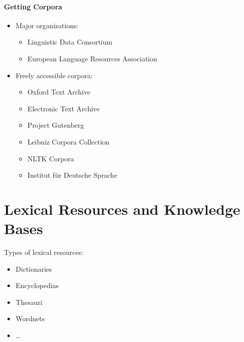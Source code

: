 			\paragraph{Getting Corpora} %
				\begin{itemize}
					\item Major organizations:
						\begin{itemize}
							\item Linguistic Data Consortium
							\item European Language Resources Association
						\end{itemize}
					\item Freely accessible corpora:
						\begin{itemize}
							\item Oxford Text Archive
							\item Electronic Text Archive
							\item Project Gutenberg
							\item Leibniz Corpora Collection
							\item NLTK Corpora
							\item Institut für Deutsche Sprache
						\end{itemize}
				\end{itemize}

	\section{Lexical Resources and Knowledge Bases} %
		Types of lexical resources:
		\begin{itemize}
			\item Dictionaries
			\item Encyclopedias
			\item Thesauri
			\item Wordnets
			\item \dots
		\end{itemize}

